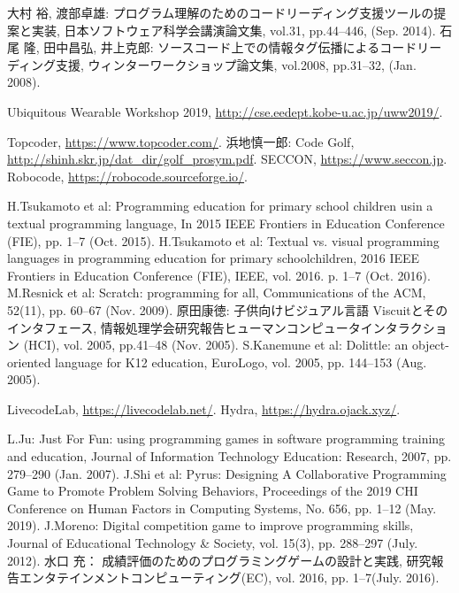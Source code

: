 \begin{thebibliography}{99}
	大村 裕, 渡部卓雄: プログラム理解のためのコードリーディング支援ツールの提案と実装, 日本ソフトウェア科学会講演論文集, vol.31, pp.44--446, (Sep. 2014).
	石尾 隆, 田中昌弘, 井上克郎: ソースコード上での情報タグ伝播によるコードリーディング支援, ウィンターワークショップ論文集, vol.2008, pp.31--32, (Jan. 2008).

	Ubiquitous Wearable Workshop 2019, \url{http://cse.eedept.kobe-u.ac.jp/uww2019/}.


	Topcoder, \url{https://www.topcoder.com/}.
	浜地慎一郎: Code Golf, \url{http://shinh.skr.jp/dat_dir/golf_prosym.pdf}.
	SECCON, \url{https://www.seccon.jp}.
	Robocode, \url{https://robocode.sourceforge.io/}.

	H.Tsukamoto et al: Programming education for primary school children usin a textual programming language, In 2015 IEEE Frontiers in Education Conference (FIE), pp. 1--7 (Oct. 2015).
	H.Tsukamoto et al: Textual vs. visual programming languages in programming education for primary schoolchildren, 2016 IEEE Frontiers in Education Conference (FIE), IEEE, vol. 2016. p. 1--7 (Oct. 2016).
	M.Resnick et al: Scratch: programming for all, Communications of the ACM, 52(11), pp. 60--67 (Nov. 2009).
	原田康徳: 子供向けビジュアル言語 Viscuitとそのインタフェース, 情報処理学会研究報告ヒューマンコンピュータインタラクション (HCI), vol. 2005, pp.41--48 (Nov. 2005).
	S.Kanemune et al: Dolittle: an object-oriented language for K12 education, EuroLogo, vol. 2005, pp. 144--153 (Aug. 2005).

	LivecodeLab, \url{https://livecodelab.net/}.
	Hydra, \url{https://hydra.ojack.xyz/}.

	L.Ju: Just For Fun: using programming games in software programming training and education, Journal of Information Technology Education: Research, 2007, pp. 279--290 (Jan. 2007).
	J.Shi et al: Pyrus: Designing A Collaborative Programming Game to Promote Problem Solving Behaviors, Proceedings of the 2019 CHI Conference on Human Factors in Computing Systems, No. 656, pp. 1--12 (May. 2019).
	J.Moreno: Digital competition game to improve programming skills, Journal of Educational Technology \& Society, vol. 15(3), pp. 288--297 (July. 2012).
	水口 充： 成績評価のためのプログラミングゲームの設計と実践, 研究報告エンタテインメントコンピューティング(EC), vol. 2016, pp. 1–7(July. 2016).


\end{thebibliography}
